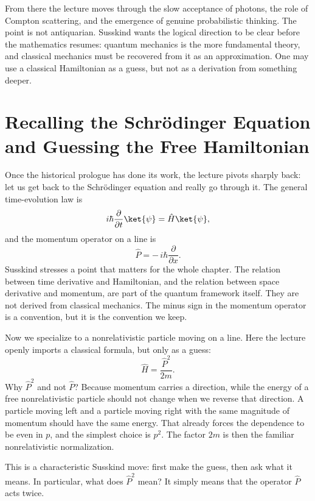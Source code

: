 From there the lecture moves through the slow acceptance of photons, the role of Compton scattering, and the emergence of genuine probabilistic thinking. The point is not antiquarian. Susskind wants the logical direction to be clear before the mathematics resumes: quantum mechanics is the more fundamental theory, and classical mechanics must be recovered from it as an approximation. One may use a classical Hamiltonian as a guess, but not as a derivation from something deeper.

\section{Recalling the Schr\"odinger Equation and Guessing the Free Hamiltonian}

Once the historical prologue has done its work, the lecture pivots sharply back: let us get back to the Schr\"odinger equation and really go through it. The general time-evolution law is
\begin{equation}
i\hbar \frac{\partial}{\partial t}\ket{\psi} = \hat H \ket{\psi},
\end{equation}
and the momentum operator on a line is
\begin{equation}
\hat P = -\,i\hbar \frac{\partial}{\partial x}.
\end{equation}
Susskind stresses a point that matters for the whole chapter. The relation between time derivative and Hamiltonian, and the relation between space derivative and momentum, are part of the quantum framework itself. They are not derived from classical mechanics. The minus sign in the momentum operator is a convention, but it is the convention we keep.

Now we specialize to a nonrelativistic particle moving on a line. Here the lecture openly imports a classical formula, but only as a guess:
\begin{equation}
\hat H = \frac{\hat P^2}{2m}.
\end{equation}
Why \(\hat P^2\) and not \(\hat P\)? Because momentum carries a direction, while the energy of a free nonrelativistic particle should not change when we reverse that direction. A particle moving left and a particle moving right with the same magnitude of momentum should have the same energy. That already forces the dependence to be even in \(p\), and the simplest choice is \(p^2\). The factor \(2m\) is then the familiar nonrelativistic normalization.

This is a characteristic Susskind move: first make the guess, then ask what it means. In particular, what does \(\hat P^2\) mean? It simply means that the operator \(\hat P\) acts twice.

